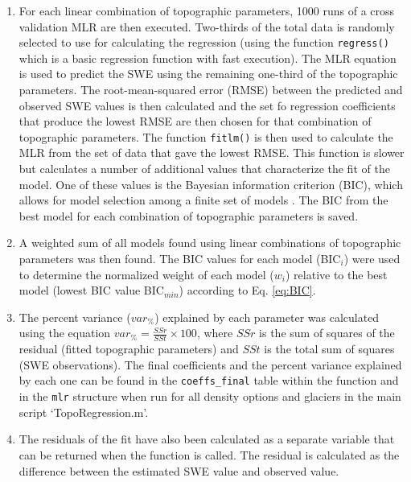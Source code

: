 \documentclass{sfuthesis}
\begin{document}
\begin{appendices}
\begin{enumerate}
\item For each linear combination of topographic parameters, 1000 runs of a cross validation MLR are then executed. Two-thirds of the total data is randomly selected \citep{Kohavi1995} to use for calculating the regression (using the function \texttt{regress()} which is a basic regression function with fast execution). The MLR equation is used to predict the SWE using the remaining one-third of the topographic parameters. The root-mean-squared error (RMSE) between the predicted and observed SWE values is then calculated and the set fo regression coefficients that produce the lowest RMSE are then chosen for that combination of topographic parameters. The function \texttt{fitlm()} is then used to calculate the MLR from the set of data that gave the lowest RMSE. This function is slower but calculates a number of additional values that characterize the fit of the model. One of these values is the Bayesian information criterion (BIC), which allows for model selection among a finite set of models \citep{Burnham2004}. The BIC from the best model for each combination of topographic parameters is saved.

\item A weighted sum of all models found using linear combinations of topographic parameters was then found. The BIC values for each model (BIC$_i$) were used to determine the normalized weight of each model ($w_i$) relative to the best model (lowest BIC value BIC$_{min}$) according to Eq. \ref{eq:BIC}.

\item The percent variance ($var_\%$) explained by each parameter was calculated using the equation $var_\% = \frac{SSr}{SSt}\times 100$, where $SSr$ is the sum of squares of the residual (fitted topographic parameters) and $SSt$ is the total sum of squares (SWE observations). The final coefficients and the percent variance explained by each one can be found in the \texttt{coeffs\_final} table within the function and in the \texttt{mlr} structure when run for all density options and glaciers in the main script `TopoRegression.m'.

\item The residuals of the fit have also been calculated as a separate variable that can be returned when the function is called. The residual is calculated as the difference between the estimated SWE value and observed value. 
\end{enumerate}
	
	

\end{appendices}
\end{document}
